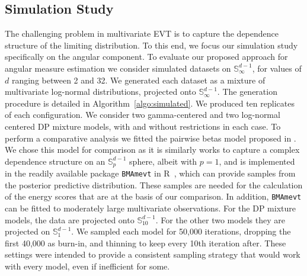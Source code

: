 \subsection{Simulation Study\label{subsec:simulated}}
The challenging problem in multivariate EVT is to capture the dependence 
    structure of the limiting distribution.  To this end, we focus our 
    simulation study specifically on the angular component.  To evaluate 
    our proposed approach for angular measure estimation 
    we consider simulated datasets on $\mathbb{S}_{\infty}^{d-1}$,
    for values of $d$ ranging between 2 and 32.  We generated each
    dataset as a mixture of multivariate log-normal distributions,
    projected onto $\mathbb{S}_{\infty}^{d-1}$. The generation 
    procedure is detailed in Algorithm~\ref{algo:simulated}. We produced 
    ten replicates of each configuration. We consider two gamma-centered
    and two log-normal centered DP mixture models, with and without restrictions in each
    case. To perform a comparative analysis we fitted 
    the pairwise betas model proposed in \cite{COOLEY2010}. We chose this model for comparison
    as it is similarly works to capture a complex dependence structure on
    an $\mathbb{S}_p^{d-1}$ sphere, albeit with $p = 1$, and is implemented in the readily 
    available package \verb|BMAmevt| in R~\citep{BMAmevt}, which can provide samples from the 
    posterior predictive distribution. These samples are needed for the calculation of the energy
    scores that are at the basis of our comparison. In addition, \verb|BMAmevt| can 
    be fitted to moderately large multivariate observations. For the DP mixture
    models, the data are projected onto $\mathbb{S}_{10}^{d-1}$. For the other
    two models they are projected on $\mathbb{S}_1^{d-1}$.   We sampled each model for 50,000 
    iterations, dropping the first 40,000 as burn-in, and thinning to keep every 10th iteration
    after.  These settings were intended to provide a consistent sampling strategy that would
    work with every model, even if inefficient for some.

